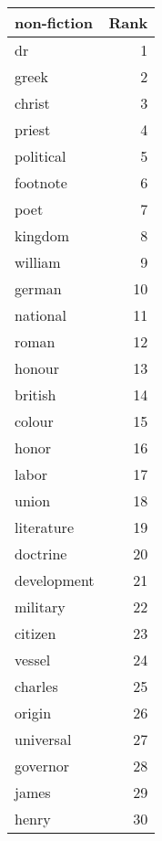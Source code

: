 \begin{table}
\label{tab:non-fiction_terms}
\begin{tabular}{lr}
\toprule
non-fiction & Rank \\
\midrule
dr & 1 \\
greek & 2 \\
christ & 3 \\
priest & 4 \\
political & 5 \\
footnote & 6 \\
poet & 7 \\
kingdom & 8 \\
william & 9 \\
german & 10 \\
national & 11 \\
roman & 12 \\
honour & 13 \\
british & 14 \\
colour & 15 \\
honor & 16 \\
labor & 17 \\
union & 18 \\
literature & 19 \\
doctrine & 20 \\
development & 21 \\
military & 22 \\
citizen & 23 \\
vessel & 24 \\
charles & 25 \\
origin & 26 \\
universal & 27 \\
governor & 28 \\
james & 29 \\
henry & 30 \\
\bottomrule
\end{tabular}
\end{table}
